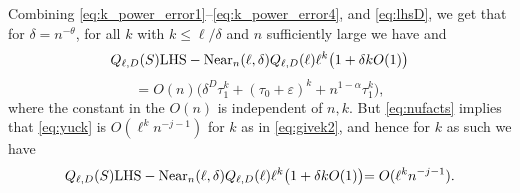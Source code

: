 \documentclass{memo-l}
\theoremstyle{plain}
\theoremstyle{definition}
\numberwithin{section}{chapter}
\numberwithin{equation}{chapter}
\theoremstyle{plain}
\theoremstyle{definition}
\begin{document}
Combining \eqref{eq:k_power_error1}--\eqref{eq:k_power_error4}, and
\eqref{eq:lhsD}, we get that for $\delta=n^{-\theta}$, for all $k$ with
$k\leq \ell/\delta$ and $n$ sufficiently large we have and \[
Q_{\ell,D}(S){\rm LHS} - {\rm Near}_n(\ell,\delta) Q_{\ell,D}(\ell) \ell^k
\bigr( 1 + \delta k O(1) \bigl) \] \begin{equation}\label{eq:yuck} = O(n)
\bigl( \delta^D \tau_1^k + (\tau_0+\varepsilon)^k + n^{1-\alpha} \tau_1^k
\bigr), \end{equation} where the constant in the $O(n)$ is independent of
$n,k$.  But \eqref{eq:nufacts} implies that \eqref{eq:yuck} is $O(\ell^k
n^{-j-1})$ for $k$ as in \eqref{eq:givek2}, and hence for $k$ as such we
have \begin{equation}\label{eq:simplify} Q_{\ell,D}(S){\rm LHS} - {\rm
Near}_n(\ell,\delta) Q_{\ell,D}(\ell) \ell^k \bigr( 1 + \delta k O(1)
\bigl) = O(\ell^k  n^{-j-1}).  \end{equation}

% 
\end{document}
